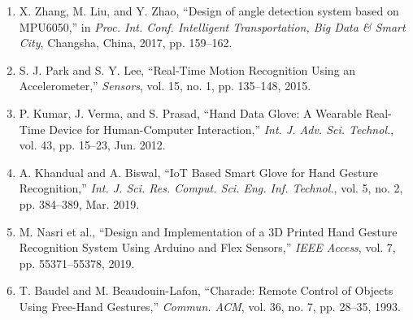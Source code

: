 \begin{enumerate}
  \item X. Zhang, M. Liu, and Y. Zhao, “Design of angle detection system based on MPU6050,” in \textit{Proc. Int. Conf. Intelligent Transportation, Big Data \& Smart City}, Changsha, China, 2017, pp. 159–162.
  \item S. J. Park and S. Y. Lee, “Real-Time Motion Recognition Using an Accelerometer,” \textit{Sensors}, vol. 15, no. 1, pp. 135–148, 2015.
  \item P. Kumar, J. Verma, and S. Prasad, “Hand Data Glove: A Wearable Real-Time Device for Human-Computer Interaction,” \textit{Int. J. Adv. Sci. Technol.}, vol. 43, pp. 15–23, Jun. 2012.
  \item A. Khandual and A. Biswal, “IoT Based Smart Glove for Hand Gesture Recognition,” \textit{Int. J. Sci. Res. Comput. Sci. Eng. Inf. Technol.}, vol. 5, no. 2, pp. 384–389, Mar. 2019.
  \item M. Nasri et al., “Design and Implementation of a 3D Printed Hand Gesture Recognition System Using Arduino and Flex Sensors,” \textit{IEEE Access}, vol. 7, pp. 55371–55378, 2019.
  \item T. Baudel and M. Beaudouin-Lafon, “Charade: Remote Control of Objects Using Free-Hand Gestures,” \textit{Commun. ACM}, vol. 36, no. 7, pp. 28–35, 1993.
\end{enumerate}